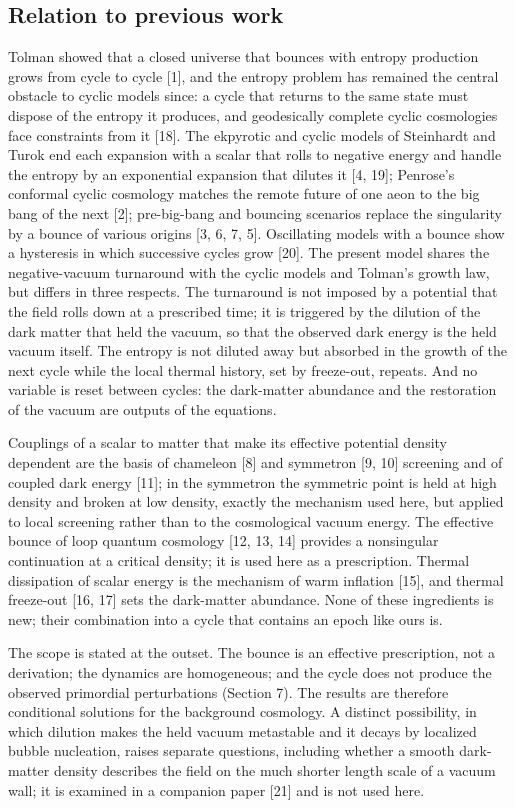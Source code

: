\documentclass[11pt,a4paper]{article}
\begin{document}
\subsection{Relation to previous work}
Tolman showed that a closed universe that bounces with entropy production grows from cycle to cycle [1], and the entropy problem has remained the central obstacle to cyclic models since: a cycle that returns to the same state must dispose of the entropy it produces, and geodesically complete cyclic cosmologies face constraints from it [18]. The ekpyrotic and cyclic models of Steinhardt and Turok end each expansion with a scalar that rolls to negative energy and handle the entropy by an exponential expansion that dilutes it [4, 19]; Penrose's conformal cyclic cosmology matches the remote future of one aeon to the big bang of the next [2]; pre-big-bang and bouncing scenarios replace the singularity by a bounce of various origins [3, 6, 7, 5]. Oscillating models with a bounce show a hysteresis in which successive cycles grow [20]. The present model shares the negative-vacuum turnaround with the cyclic models and Tolman's growth law, but differs in three respects. The turnaround is not imposed by a potential that the field rolls down at a prescribed time; it is triggered by the dilution of the dark matter that held the vacuum, so that the observed dark energy is the held vacuum itself. The entropy is not diluted away but absorbed in the growth of the next cycle while the local thermal history, set by freeze-out, repeats. And no variable is reset between cycles: the dark-matter abundance and the restoration of the vacuum are outputs of the equations.

Couplings of a scalar to matter that make its effective potential density dependent are the basis of chameleon [8] and symmetron [9, 10] screening and of coupled dark energy [11]; in the symmetron the symmetric point is held at high density and broken at low density, exactly the mechanism used here, but applied to local screening rather than to the cosmological vacuum energy. The effective bounce of loop quantum cosmology [12, 13, 14] provides a nonsingular continuation at a critical density; it is used here as a prescription. Thermal dissipation of scalar energy is the mechanism of warm inflation [15], and thermal freeze-out [16, 17] sets the dark-matter abundance. None of these ingredients is new; their combination into a cycle that contains an epoch like ours is.

The scope is stated at the outset. The bounce is an effective prescription, not a derivation; the dynamics are homogeneous; and the cycle does not produce the observed primordial perturbations (Section 7). The results are therefore conditional solutions for the background cosmology. A distinct possibility, in which dilution makes the held vacuum metastable and it decays by localized bubble nucleation, raises separate questions, including whether a smooth dark-matter density describes the field on the much shorter length scale of a vacuum wall; it is examined in a companion paper [21] and is not used here.
\end{document}
